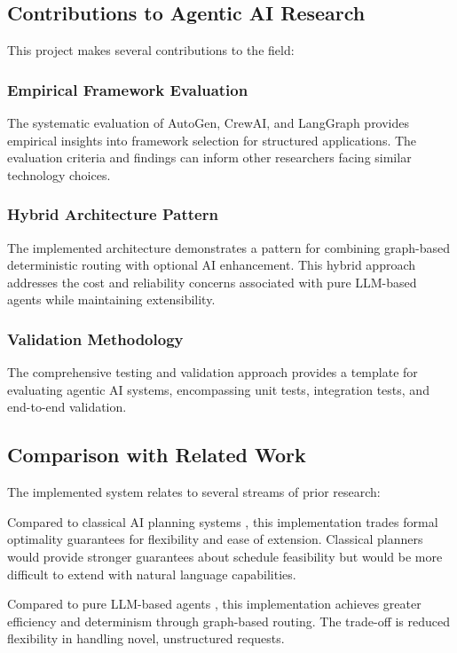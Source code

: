 \documentclass[12pt]{article}
\begin{document}
\subsection{Contributions to Agentic AI Research}

This project makes several contributions to the field:

\subsubsection{Empirical Framework Evaluation}
The systematic evaluation of AutoGen, CrewAI, and LangGraph provides empirical insights into framework selection for structured applications. The evaluation criteria and findings can inform other researchers facing similar technology choices.

\subsubsection{Hybrid Architecture Pattern}
The implemented architecture demonstrates a pattern for combining graph-based deterministic routing with optional AI enhancement. This hybrid approach addresses the cost and reliability concerns associated with pure LLM-based agents while maintaining extensibility.

\subsubsection{Validation Methodology}
The comprehensive testing and validation approach provides a template for evaluating agentic AI systems, encompassing unit tests, integration tests, and end-to-end validation.

\subsection{Comparison with Related Work}

The implemented system relates to several streams of prior research:

Compared to classical AI planning systems \parencite{ghallab2016automated}, this implementation trades formal optimality guarantees for flexibility and ease of extension. Classical planners would provide stronger guarantees about schedule feasibility but would be more difficult to extend with natural language capabilities.

Compared to pure LLM-based agents \parencite{wang2024survey}, this implementation achieves greater efficiency and determinism through graph-based routing. The trade-off is reduced flexibility in handling novel, unstructured requests.
\end{document}
